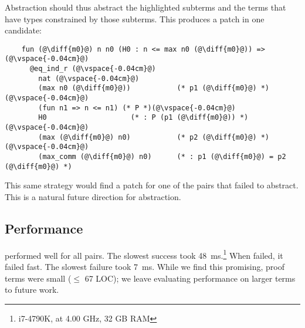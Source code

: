 Abstraction should thus abstract the highlighted subterms and the
terms that have types constrained by those subterms.
This produces a patch in one candidate:

\begin{lstlisting}
    fun (@\diff{m0}@) n n0 (H0 : n <= max n0 (@\diff{m0}@)) =>(@\vspace{-0.04cm}@)
      @eq_ind_r (@\vspace{-0.04cm}@)
        nat (@\vspace{-0.04cm}@)
        (max n0 (@\diff{m0}@))           (* p1 (@\diff{m0}@) *)(@\vspace{-0.04cm}@)
        (fun n1 => n <= n1) (* P *)(@\vspace{-0.04cm}@)
        H0                    (* : P (p1 (@\diff{m0}@)) *)(@\vspace{-0.04cm}@)
        (max (@\diff{m0}@) n0)           (* p2 (@\diff{m0}@) *)(@\vspace{-0.04cm}@)
        (max_comm (@\diff{m0}@) n0)      (* : p1 (@\diff{m0}@) = p2 (@\diff{m0}@) *)
\end{lstlisting}

This same strategy would find a patch for one of the pairs that \sysname failed to 
abstract. %
This is a natural future direction for abstraction.

\subsection{Performance}
\label{sec:perf}

\sysname performed well for all pairs. The slowest success took \SI{48}{\ms}.\footnote{i7-4790K, at 4.00 GHz, 32 GB RAM}
When \sysname failed, it failed fast. The slowest failure took \SI{7}{\ms}.
While we find this promising, proof terms were small ($\le$ 67 LOC);
we leave evaluating performance on larger terms
to future work.



